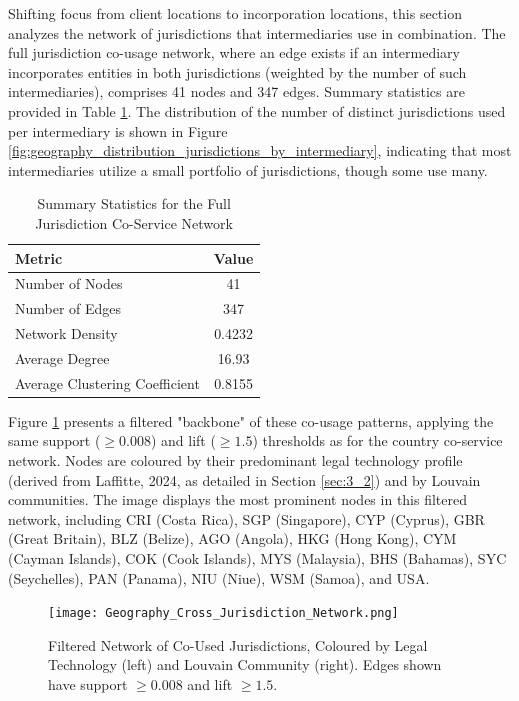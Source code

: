 Shifting focus from client locations to incorporation locations, this section analyzes the network of jurisdictions that intermediaries use in combination. The full jurisdiction co-usage network, where an edge exists if an intermediary incorporates entities in both jurisdictions (weighted by the number of such intermediaries), comprises 41 nodes and 347 edges. Summary statistics are provided in Table \ref{tab:jurisdiction_network_summary}. The distribution of the number of distinct jurisdictions used per intermediary is shown in Figure \ref{fig:geography_distribution_jurisdictions_by_intermediary}, indicating that most intermediaries utilize a small portfolio of jurisdictions, though some use many.

\begin{table}[htbp]
\centering
\caption{Summary Statistics for the Full Jurisdiction Co-Service Network}
\label{tab:jurisdiction_network_summary}
\begin{tabular}{lc}
\toprule
\textbf{Metric}                        & \textbf{Value}    \\
\midrule
Number of Nodes               & 41       \\
Number of Edges               & 347      \\
Network Density               & 0.4232   \\
Average Degree                & 16.93    \\
Average Clustering Coefficient & 0.8155   \\
\bottomrule
\end{tabular}
\end{table}

Figure \ref{fig:geography_cross_jurisdiction_network} presents a filtered "backbone" of these co-usage patterns, applying the same support ($\ge 0.008$) and lift ($\ge 1.5$) thresholds as for the country co-service network. Nodes are coloured by their predominant legal technology profile (derived from Laffitte, 2024, as detailed in Section \ref{sec:3_2}) and by Louvain communities. The image displays the most prominent nodes in this filtered network, including CRI (Costa Rica), SGP (Singapore), CYP (Cyprus), GBR (Great Britain), BLZ (Belize), AGO (Angola), HKG (Hong Kong), CYM (Cayman Islands), COK (Cook Islands), MYS (Malaysia), BHS (Bahamas), SYC (Seychelles), PAN (Panama), NIU (Niue), WSM (Samoa), and USA.

\begin{figure}[htbp]
    \centering
    \texttt{[image: Geography\_Cross\_Jurisdiction\_Network.png]}
    \caption{Filtered Network of Co-Used Jurisdictions, Coloured by Legal Technology (left) and Louvain Community (right). Edges shown have support $\ge 0.008$ and lift $\ge 1.5$.}
    \label{fig:geography_cross_jurisdiction_network}
\end{figure}

